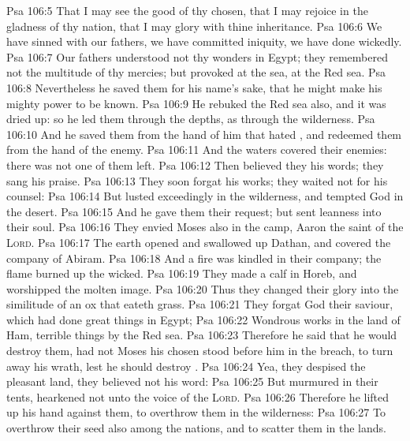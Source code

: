 \vs Psa 106:5 That I may see the good of thy chosen, that I may rejoice in the gladness of thy nation, that I may glory with thine inheritance.
\vs Psa 106:6 We have sinned with our fathers, we have committed iniquity, we have done wickedly.
\vs Psa 106:7 Our fathers understood not thy wonders in Egypt; they remembered not the multitude of thy mercies; but provoked  at the sea,  at the Red sea.
\vs Psa 106:8 Nevertheless he saved them for his name's sake, that he might make his mighty power to be known.
\vs Psa 106:9 He rebuked the Red sea also, and it was dried up: so he led them through the depths, as through the wilderness.
\vs Psa 106:10 And he saved them from the hand of him that hated , and redeemed them from the hand of the enemy.
\vs Psa 106:11 And the waters covered their enemies: there was not one of them left.
\vs Psa 106:12 Then believed they his words; they sang his praise.
\vs Psa 106:13 They soon forgat his works; they waited not for his counsel:
\vs Psa 106:14 But lusted exceedingly in the wilderness, and tempted God in the desert.
\vs Psa 106:15 And he gave them their request; but sent leanness into their soul.
\vs Psa 106:16 They envied Moses also in the camp,  Aaron the saint of the \textsc{Lord}.
\vs Psa 106:17 The earth opened and swallowed up Dathan, and covered the company of Abiram.
\vs Psa 106:18 And a fire was kindled in their company; the flame burned up the wicked.
\vs Psa 106:19 They made a calf in Horeb, and worshipped the molten image.
\vs Psa 106:20 Thus they changed their glory into the similitude of an ox that eateth grass.
\vs Psa 106:21 They forgat God their saviour, which had done great things in Egypt;
\vs Psa 106:22 Wondrous works in the land of Ham,  terrible things by the Red sea.
\vs Psa 106:23 Therefore he said that he would destroy them, had not Moses his chosen stood before him in the breach, to turn away his wrath, lest he should destroy .
\vs Psa 106:24 Yea, they despised the pleasant land, they believed not his word:
\vs Psa 106:25 But murmured in their tents,  hearkened not unto the voice of the \textsc{Lord}.
\vs Psa 106:26 Therefore he lifted up his hand against them, to overthrow them in the wilderness:
\vs Psa 106:27 To overthrow their seed also among the nations, and to scatter them in the lands.
